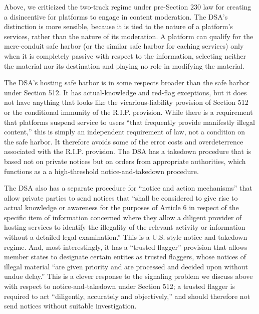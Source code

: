 Above, we criticized the two-track regime under pre-Section 230 law for creating a disincentive for platforms to engage in content moderation. The DSA's distinction is more sensible, because it is tied to the nature of a platform's services, rather than the nature of its moderation. A platform can qualify for the mere-conduit safe harbor (or the similar safe harbor for caching services) only when it is completely passive with respect to the information, selecting neither the material nor its destination and playing no role in modifying the material. 

The DSA's hosting safe harbor is in some respects broader than the safe harbor under Section 512. It has actual-knowledge and red-flag exceptions, but it does not have anything that looks like the vicarious-liability provision of Section 512 or the conditional immunity of the R.I.P. provision. While there is a requirement that platforms suspend service to users ``that frequently provide manifestly illegal content,'' this is simply an independent requirement of law, not a condition on the safe harbor. It therefore avoids some of the error costs and overdeterrence associated with the R.I.P. provision. The DSA has a takedown procedure that is based not on private notices but on orders from appropriate authorities, which  functions as a a high-threshold notice-and-takedown procedure.

The DSA also has a separate procedure for ``notice and action mechanisms'' that allow private parties to send notices that ``shall be considered to give rise to actual knowledge or awareness for the purposes of Article 6 in respect of the specific item of information concerned where they allow a diligent provider of hosting services to identify the illegality of the relevant activity or information without a detailed legal examination.'' This is a  U.S.-style notice-and-takedown regime. And, most interestingly, it has a ``trusted flagger'' provision that allows member states to designate certain entites as trusted flaggers, whose notices of illegal material ``are given priority and are processed and decided upon without undue delay.'' This is a clever response to the signaling problem we discuss above with respect to notice-and-takedown under Section 512; a trusted flagger is required to act ``diligently, accurately and objectively,'' and should therefore not send notices without suitable investigation.

